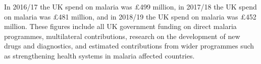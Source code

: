 In 2016/17 the UK spend on malaria was \pounds 499 million, in 2017/18 the UK spend on malaria was \pounds 481 million, and in 2018/19 the UK spend on malaria was \pounds 452 million. %
These figures include all UK government funding on direct malaria programmes, multilateral contributions, research on the development of new drugs and diagnostics, and estimated contributions from wider programmes such as strengthening health systems in malaria affected countries. %


\newpage
